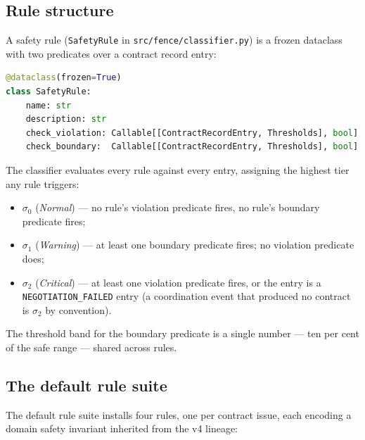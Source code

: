 \subsection{Rule structure}

A safety rule (\texttt{SafetyRule} in
\texttt{src/fence/classifier.py}) is a frozen dataclass with two
predicates over a contract record entry:

\begin{lstlisting}[language=Python,caption={The safety-rule
abstraction; each rule is one violation predicate paired with a
narrower-margin boundary predicate.},label={lst:impl-rule}]
@dataclass(frozen=True)
class SafetyRule:
    name: str
    description: str
    check_violation: Callable[[ContractRecordEntry, Thresholds], bool]
    check_boundary:  Callable[[ContractRecordEntry, Thresholds], bool]
\end{lstlisting}

The classifier evaluates every rule against every entry, assigning
the highest tier any rule triggers:

\begin{itemize}[leftmargin=1.4em,itemsep=0.15em]
  \item $\sigma_0$ (\emph{Normal}) --- no rule's violation predicate
    fires, no rule's boundary predicate fires;
  \item $\sigma_1$ (\emph{Warning}) --- at least one boundary
    predicate fires; no violation predicate does;
  \item $\sigma_2$ (\emph{Critical}) --- at least one violation
    predicate fires, or the entry is a \texttt{NEGOTIATION\_FAILED}
    entry (a coordination event that produced no contract is
    $\sigma_2$ by convention).
\end{itemize}

The threshold band for the boundary predicate is a single number ---
ten per cent of the safe range --- shared across rules.

\subsection{The default rule suite}

The default rule suite installs four rules, one per contract issue,
each encoding a domain safety invariant inherited from the v4 lineage:

